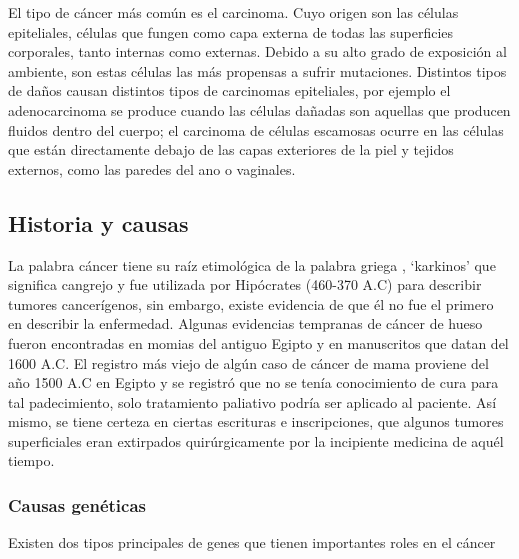 El tipo de cáncer más común es el carcinoma. Cuyo origen son
las células epiteliales, células que fungen como capa externa de todas las
superficies corporales, tanto internas como externas. Debido a su alto grado de
exposición al ambiente, son estas células las más propensas a sufrir mutaciones.
Distintos tipos de daños causan distintos tipos de carcinomas epiteliales, por
ejemplo el adenocarcinoma se produce cuando las células dañadas son aquellas que
producen fluidos dentro del cuerpo; el carcinoma de células escamosas ocurre en
las células que están directamente debajo de las capas exteriores de la piel y
tejidos externos, como las paredes del ano o
vaginales.~\cite{NationalCancerInstitute}

\subsection{Historia y causas}

La palabra cáncer tiene su raíz etimológica de la palabra griega
\textkappa\textalpha\textrho\textkappa\textiota\textnu\textomikron\textvarsigma,
`karkinos' que significa cangrejo y fue utilizada por Hipócrates (460-370 A.C)
para describir tumores cancerígenos, sin embargo, existe evidencia de que él no
fue el primero en describir la enfermedad. Algunas evidencias tempranas de
cáncer de hueso fueron encontradas en momias del antiguo Egipto y en manuscritos
que datan del 1600 A.C. El registro más viejo de algún caso de cáncer de mama
proviene del año 1500 A.C en Egipto y se registró que no se tenía conocimiento
de cura para tal padecimiento, solo tratamiento paliativo podría ser aplicado al
paciente. Así mismo, se tiene certeza en ciertas escrituras e inscripciones, que
algunos tumores superficiales eran extirpados quirúrgicamente por la incipiente
medicina de aquél tiempo.~\cite{AmericanCancerSocietyb}

\subsubsection{Causas genéticas}

Existen dos tipos principales de genes que tienen importantes roles en el cáncer

